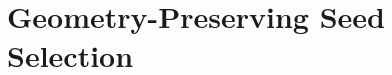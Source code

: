 \documentclass[12pt, a4paper, openany]{book}
\theoremstyle{plain}
\theoremstyle{definition}
\begin{document}
\mainmatter

\part{Geometry-Preserving Seed Selection}
\label{part:seed_selection}



\cleardoublepage
{}
{}
\printbibliography[title={Bibliography}]
\end{document}
